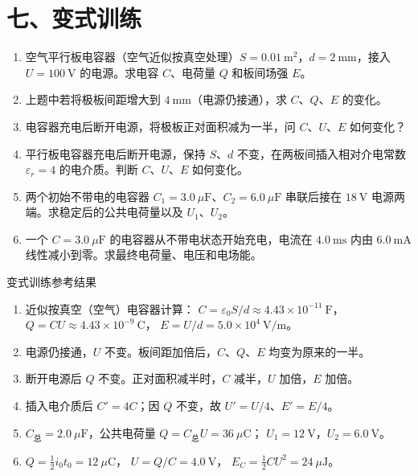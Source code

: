 \section*{七、变式训练}

\begin{enumerate}
  \item 空气平行板电容器（空气近似按真空处理）$S = 0.01\ \mathrm{m^2}$，$d = 2\ \mathrm{mm}$，接入 $U = 100\ \mathrm{V}$ 的电源。求电容 $C$、电荷量 $Q$ 和板间场强 $E$。

  \item 上题中若将极板间距增大到 $4\ \mathrm{mm}$（电源仍接通），求 $C$、$Q$、$E$ 的变化。
  \begin{center}
  
  \end{center}

  \item 电容器充电后断开电源，将极板正对面积减为一半，问 $C$、$U$、$E$ 如何变化？

  \item 平行板电容器充电后断开电源，保持 $S$、$d$ 不变，在两板间插入相对介电常数 $\varepsilon_r=4$ 的电介质。判断 $C$、$U$、$E$ 如何变化。

  \item 两个初始不带电的电容器 $C_1=3.0\ \mu\mathrm F$、$C_2=6.0\ \mu\mathrm F$ 串联后接在 $18\ \mathrm V$ 电源两端。求稳定后的公共电荷量以及 $U_1$、$U_2$。

  \item 一个 $C=3.0\ \mu\mathrm F$ 的电容器从不带电状态开始充电，电流在 $4.0\ \mathrm{ms}$ 内由 $6.0\ \mathrm{mA}$ 线性减小到零。求最终电荷量、电压和电场能。
\end{enumerate}

\begin{learningbox}{变式训练参考结果}
\begin{enumerate}[itemsep=0.45em,topsep=0.3em,parsep=0pt]
  \item 近似按真空（空气）电容器计算：
  $C=\varepsilon_0S/d\approx4.43\times10^{-11}\ \mathrm F$，
  $Q=CU\approx4.43\times10^{-9}\ \mathrm C$，
  $E=U/d=5.0\times10^4\ \mathrm{V/m}$。
  \item 电源仍接通，$U$ 不变。板间距加倍后，$C$、$Q$、$E$ 均变为原来的一半。
  \item 断开电源后 $Q$ 不变。正对面积减半时，$C$ 减半，$U$ 加倍，$E$ 加倍。
  \item 插入电介质后 $C'=4C$；因 $Q$ 不变，故 $U'=U/4$、$E'=E/4$。
  \item $C_{\text{总}}=2.0\ \mu\mathrm F$，公共电荷量
  $Q=C_{\text{总}}U=36\ \mu\mathrm C$；
  $U_1=12\ \mathrm V$，$U_2=6.0\ \mathrm V$。
  \item $Q=\frac12i_0t_0=12\ \mu\mathrm C$，
  $U=Q/C=4.0\ \mathrm V$，
  $E_C=\frac12CU^2=24\ \mu\mathrm J$。
\end{enumerate}
\end{learningbox}

